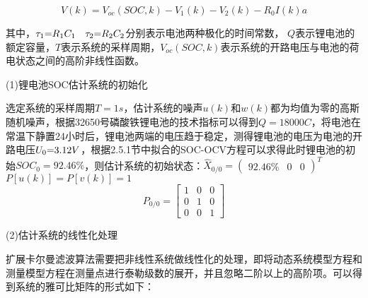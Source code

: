 \begin{equation}
V\left( k \right) = {V_{oc}}\left( {SOC,k} \right) - {V_1}\left( k \right) - {V_2}\left( k \right) - {R_0}I\left( k \right)a
\end{equation} 

其中，${\tau _1}{\rm{ = }}{R_1}{C_1}$~ ${\tau _2}{\rm{ = }}{R_2}{C_2}$分别表示电池两种极化的时间常数， $Q$表示锂电池的额定容量，$T$表示系统的采样周期，${V_{oc}}\left( {SOC,k} \right)$表示系统的开路电压与电池的荷电状态之间的高阶非线性函数。

(1)锂电池SOC估计系统的初始化

选定系统的采样周期$T = 1s$，估计系统的噪声$u\left( k \right)$和$w\left( k \right)$都为均值为零的高斯随机噪声，根据32650号磷酸铁锂电池的技术指标可以得到$Q = 18000C$，将电池在常温下静置24小时后，锂电池两端的电压趋于稳定，测得锂电池的电压为电池的开路电压${U_0}{\rm{ = }}3.12V$，根据2.5.1节中拟合的SOC-OCV方程可以求得此时锂电池的初始$SO{C_0} = 92.46\% $，则估计系统的初始状态：${\widehat X_{0/0}} = {\left( {\begin{array}{*{20}{c}}
{92.46\% }&0&0
\end{array}} \right)^T}$~$P\left[ {u\left( k \right)} \right] = P\left[ {v\left( k \right)} \right] = 1$
\[{P_{0/0}} = \left[ {\begin{array}{*{20}{c}}
1&0&0\\
0&1&0\\
0&0&1
\end{array}} \right]\]

(2)估计系统的线性化处理

	扩展卡尔曼滤波算法需要把非线性系统做线性化的处理，即将动态系统模型方程和测量模型方程在测量点进行泰勒级数的展开，并且忽略二阶以上的高阶项。可以得到系统的雅可比矩阵的形式如下：

